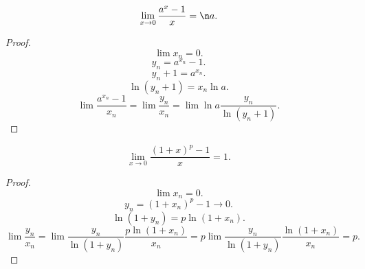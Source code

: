 \documentclass[11pt, oneside]{article}   	%
\begin{document}
    \begin{theorem}
        \[ \lim\limits_{x \to 0} \frac{a^x-1}{x} = \n a .\]
        \begin{proof}
            \[ \lim x_n = 0.\]
            \[ y_n = a^{x_n} - 1 .\]
            \[ y_n + 1 = a^{x_n} .\]
            \[ \ln\left( y_n+1 \right) = x_n\ln a  .\]
            \[ \lim \frac{a^{x_n}-1}{x_n} = \lim \frac{y_n}{x_n} = \lim \ln a\frac{y_n}{\ln (y_n+1)} .\] 
        \end{proof}
    \end{theorem}
    \begin{theorem}
        \[ \lim\limits_{x \to 0} \frac{(1+x)^{p}-1}{x} = 1 .\]
        \begin{proof}
            \[ \lim x_n = 0 .\]
            \[ y_n = \left( 1+x_n \right)^{p} - 1 \to 0.\]
            \[ \ln(1+y_n) = p\ln(1+x_n) .\]
            \[ \lim \frac{y_n}{x_n} = \lim \frac{y_n}{\ln\left( 1+y_n \right) }\frac{p\ln\left( 1+x_n \right) }{x_n} = p\lim \frac{y_n}{\ln(1+y_n)}\frac{\ln(1+x_n)}{x_n} =p .\] 
        \end{proof}
    \end{theorem}
\end{document}
